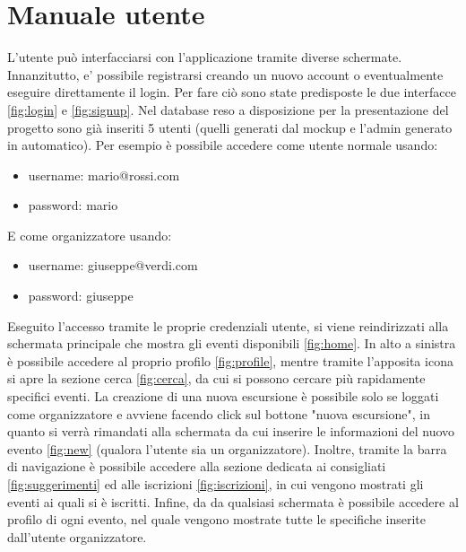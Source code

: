\section{Manuale utente}
L'utente può interfacciarsi con l'applicazione tramite diverse schermate. Innanzitutto, e' possibile registrarsi creando un nuovo account o eventualmente eseguire direttamente il login. Per fare ciò sono state predisposte le due interfacce \ref{fig:login} e \ref{fig:signup}. Nel database reso a disposizione per la presentazione del progetto sono già inseriti 5 utenti (quelli generati dal mockup e l'admin generato in automatico). Per esempio è possibile accedere come utente normale usando:
\begin{itemize}
    \item username: mario@rossi.com
    \item password: mario
\end{itemize}
E come organizzatore usando:
\begin{itemize}
    \item username: giuseppe@verdi.com
    \item password: giuseppe
\end{itemize}
Eseguito l'accesso tramite le proprie credenziali utente, si viene reindirizzati alla schermata principale che mostra gli eventi disponibili \ref{fig:home}. In alto a sinistra è possibile accedere al proprio profilo \ref{fig:profile}, mentre tramite l'apposita icona si apre la sezione cerca \ref{fig:cerca}, da cui si possono cercare più rapidamente specifici eventi. La creazione di una nuova escursione è possibile solo se loggati come organizzatore e avviene facendo click sul bottone "nuova escursione", in quanto si verrà rimandati alla schermata  da cui inserire le informazioni del nuovo evento \ref{fig:new} (qualora l'utente sia un organizzatore). Inoltre, tramite la barra di navigazione è possibile accedere alla sezione dedicata ai consigliati \ref{fig:suggerimenti} ed alle iscrizioni \ref{fig:iscrizioni}, in cui vengono mostrati gli eventi ai quali si è iscritti. Infine, da da qualsiasi schermata è possibile accedere al profilo di ogni evento, nel quale vengono mostrate tutte le specifiche inserite
dall'utente organizzatore.
